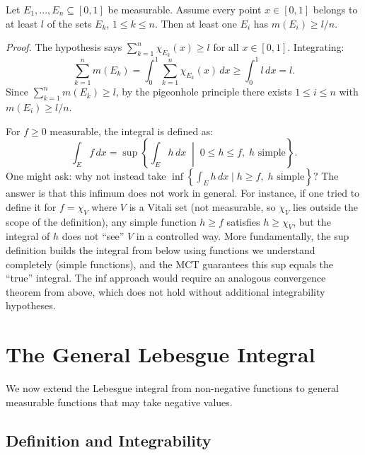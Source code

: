 \documentclass[11pt]{report}
\begin{document}
\begin{exbox}
Let $E_1, \ldots, E_n \subseteq [0,1]$ be measurable. Assume every point $x \in [0,1]$ belongs to at least $l$ of the sets $E_k$, $1 \leq k \leq n$. Then at least one $E_i$ has $m(E_i) \geq l/n$.

\textit{Proof.} The hypothesis says $\sum_{k=1}^{n} \chi_{E_k}(x) \geq l$ for all $x \in [0,1]$. Integrating:
\[
\sum_{k=1}^{n} m(E_k) = \int_0^1 \sum_{k=1}^{n} \chi_{E_k}(x)\,dx \geq \int_0^1 l\,dx = l.
\]
Since $\sum_{k=1}^n m(E_k) \geq l$, by the pigeonhole principle there exists $1 \leq i \leq n$ with $m(E_i) \geq l/n$.
\end{exbox}

\begin{rembox}
For $f \geq 0$ measurable, the integral is defined as:
\[
\int_E f\,dx = \sup\left\{\int_E h\,dx \;\middle|\; 0 \leq h \leq f,\; h \text{ simple}\right\}.
\]
One might ask: why not instead take $\inf\!\left\{\int_E h\,dx \mid h \geq f,\; h \text{ simple}\right\}$? The answer is that this infimum does not work in general. For instance, if one tried to define it for $f = \chi_V$ where $V$ is a Vitali set (not measurable, so $\chi_V$ lies outside the scope of the definition), any simple function $h \geq f$ satisfies $h \geq \chi_V$, but the integral of $h$ does not ``see'' $V$ in a controlled way. More fundamentally, the sup definition builds the integral from below using functions we understand completely (simple functions), and the MCT guarantees this sup equals the ``true'' integral. The inf approach would require an analogous convergence theorem from above, which does not hold without additional integrability hypotheses.
\end{rembox}

\newpage
\section{The General Lebesgue Integral}

We now extend the Lebesgue integral from non-negative functions to general measurable functions that may take negative values.

\subsection{Definition and Integrability}
\end{document}
